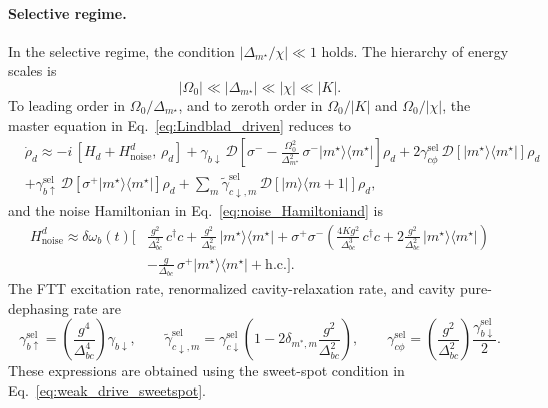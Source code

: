 \paragraph{Selective regime.}
In the selective regime, the condition $|\Delta_{m^\star}/\chi|\ll 1$ holds. The hierarchy of energy scales is
\begin{equation}
|\Omega_0| \ll |\Delta_{m^\star}| \ll |\chi| \ll |K|.
\end{equation}
To leading order in $\Omega_0/\Delta_{m^\star}$, and to zeroth order in $\Omega_0/|K|$ and $\Omega_0/|\chi|$, the master equation in Eq.~\eqref{eq:Lindblad_driven} reduces to
\begin{align}
\label{selectivelinbladmasterequation}
&\dot{\rho}_d \approx -i\,[H_d + H_{\mathrm{noise}}^{d},\,\rho_d] + \gamma_{b\downarrow}\,\mathcal{D}\!\left[\sigma^- - \frac{\Omega_0^2}{\Delta_{m^\star}^2}\,\sigma^- |m^\star\rangle\langle m^\star|\right]\rho_d
+ 2\gamma_{c\phi}^{\mathrm{sel}}\,\mathcal{D}\!\left[|m^\star\rangle\langle m^\star|\right]\rho_d \nonumber\\
&+ \gamma_{b\uparrow}^{\mathrm{sel}}\,\mathcal{D}\!\left[\sigma^+ |m^\star\rangle\langle m^\star|\right]\rho_d
+ \sum_m \widetilde{\gamma}_{c\downarrow,m}^{\mathrm{sel}}\,\mathcal{D}\!\left[|m\rangle\langle m+1|\right]\rho_d ,
\end{align}
and the noise Hamiltonian in Eq.~\eqref{eq:noise_Hamiltoniand} is
\begin{align}
\label{selectivenoisehamiltonian}
H_{\mathrm{noise}}^{d}
\approx \delta\omega_b(t)\Bigg[
&\frac{g^2}{\Delta_{bc}^2}\,c^\dagger c
+ \frac{g^2}{\Delta_{bc}^2}\,|m^\star\rangle\langle m^\star| + \sigma^+\sigma^-\!\left(\frac{4Kg^2}{\Delta_{bc}^3}\,c^\dagger c
+ 2\frac{g^2}{\Delta_{bc}^2}\,|m^\star\rangle\langle m^\star|\right) \nonumber\\
&- \frac{g}{\Delta_{bc}}\,\sigma^+ |m^\star\rangle\langle m^\star|
+ \mathrm{h.c.}
\Bigg].
\end{align}
The FTT excitation rate, renormalized cavity-relaxation rate, and cavity pure-dephasing rate are
\begin{equation}
\gamma_{b\uparrow}^{\mathrm{sel}} = \left(\frac{g^4}{\Delta_{bc}^4}\right)\gamma_{b\downarrow}, \qquad
\widetilde{\gamma}_{c\downarrow,m}^{\mathrm{sel}} = \gamma_{c\downarrow}^{\mathrm{sel}}\left(1 - 2\delta_{m^*,m}\frac{g^2}{\Delta_{bc}^2}\right), \qquad
\gamma_{c\phi}^{\mathrm{sel}} = \left(\frac{g^2}{\Delta_{bc}^2}\right)\frac{\gamma_{b\downarrow}^{\mathrm{sel}}}{2}.
\end{equation}
These expressions are obtained using the sweet-spot condition in Eq.~\eqref{eq:weak_drive_sweetspot}.

